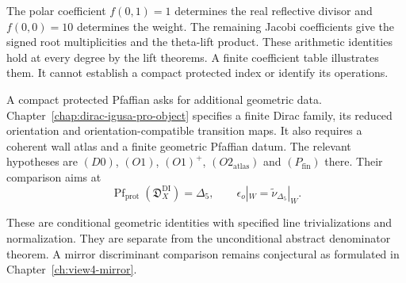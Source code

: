 \begin{remark}
\label{rem:bkm-fourier-anchor}
The polar coefficient $f(0,1)=1$ determines the real reflective
divisor and $f(0,0)=10$ determines the weight. The remaining
Jacobi coefficients give the signed root multiplicities and the
theta-lift product. These arithmetic identities hold at every
degree by the lift theorems. A finite coefficient table illustrates
them. It cannot establish a compact protected index or identify its
operations.
\end{remark}

A compact protected Pfaffian asks for additional geometric data.
Chapter~\ref{chap:dirac-igusa-pro-object} specifies a finite Dirac
family, its reduced orientation and orientation-compatible transition
maps. It also requires a coherent wall atlas and a finite geometric
Pfaffian datum. The relevant hypotheses are
$(D0)$, $(O1)$, $(O1)^+$, $(O2_{\mathrm{atlas}})$ and
$(P_{\mathrm{fin}})$ there. Their comparison aims at
\[
 \operatorname{Pf}_{\mathrm{prot}}(\mathfrak D_X^{\mathrm{DI}})
       =\Delta_5,
 \qquad \epsilon_o|_W=\widetilde\nu_{\Delta_5}|_W.
\]

These are conditional geometric identities with specified line
trivializations and normalization. They are separate from the
unconditional abstract denominator theorem. A mirror discriminant
comparison remains conjectural as formulated in
Chapter~\ref{ch:view4-mirror}.


